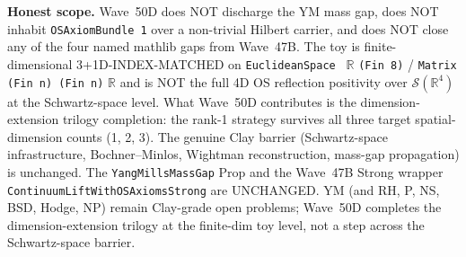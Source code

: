 \begin{remark}
\textbf{Honest scope.} Wave~50D does NOT discharge the YM mass gap, does NOT inhabit \texttt{OSAxiomBundle 1} over a non-trivial Hilbert carrier, and does NOT close any of the four named mathlib gaps from Wave~47B. The toy is finite-dimensional 3+1D-INDEX-MATCHED on \texttt{EuclideanSpace } $\mathbb{R}$ \texttt{(Fin 8)} / \texttt{Matrix (Fin n) (Fin n)} $\mathbb{R}$ and is NOT the full 4D OS reflection positivity over $\mathcal{S}(\mathbb{R}^4)$ at the Schwartz-space level. What Wave~50D contributes is the dimension-extension trilogy completion: the rank-1 strategy survives all three target spatial-dimension counts (1, 2, 3). The genuine Clay barrier (Schwartz-space infrastructure, Bochner--Minlos, Wightman reconstruction, mass-gap propagation) is unchanged. The \texttt{YangMillsMassGap} Prop and the Wave~47B Strong wrapper \texttt{ContinuumLiftWithOSAxiomsStrong} are UNCHANGED. YM (and RH, P, NS, BSD, Hodge, NP) remain Clay-grade open problems; Wave~50D completes the dimension-extension trilogy at the finite-dim toy level, not a step across the Schwartz-space barrier.
\end{remark}

